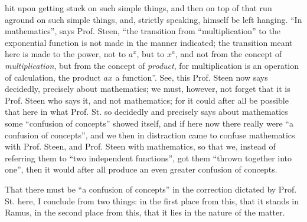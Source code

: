 \documentclass[12pt,a4paper,openany]{book}
\newcommand{\opage}[1]{\marginnote{\footnotesize\textit{[#1]}}}
\begin{document}
hit upon getting stuck on such simple things, and then on top of that run aground on such simple things, and, strictly speaking, himself
be left hanging. ``In mathematics'', says Prof. Steen,
``the transition from ``multiplication'' to the exponential function is not made in the manner indicated; the transition meant here
is made to the power, not to $a^{x}$, but to $x^{a}$, and
not from the concept of \emph{multiplication}, but from the concept
of \emph{product}, for multiplication is an operation of calculation, the product
$ax$ a function''. See, this Prof. Steen now says
decidedly, precisely about mathematics; we must, however, not
forget that it is Prof. Steen who says it, and not
mathematics; for it could after all be possible that here in
what Prof. St. so decidedly and precisely says about mathematics some ``confusion of concepts'' showed itself, and if here
\opage{20}\setcounter{footnote}{0}%
now there really were ``a confusion of concepts'', and we then in distraction came to confuse mathematics with Prof. Steen,
and Prof. Steen with mathematics, so that we, instead
of referring them to ``two independent functions'', got them
``thrown together into one'', then it would after all produce an even
greater confusion of concepts.

That there must be ``a confusion of concepts'' in the correction dictated by Prof. St. here,
I conclude from two things: in the
first place from this, that it stands in Ramus, in the second place
from this, that it lies in the nature of the matter.
\end{document}
